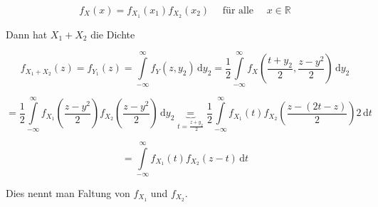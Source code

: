 \documentclass[12pt, a4paper]{article}
\theoremstyle{empty}
\newcommand{\R}{\mathbb{R}}
\newcommand{\1}{\mathds{1}}
\renewcommand{\d}{\,\mathrm{d}}
\providecommand{\mtext}[1]{\quad \text{#1} \quad}
\begin{document}
\[ f_X (x) = f_{X_1}(x_1) f_{X_2}(x_2) \mtext{ für alle } x \in \R      \]

Dann hat $X_1 + X_2$ die Dichte 

\[   f_{X_1 + X_2} (z) = f_{Y_1} (z) = \int\limits_{-\infty}^{\infty} f_Y (z, y_2) \d y_2  = \frac{1}{2} \int\limits_{-\infty}^{\infty} f_X (\frac{t + y_2}{2} , \frac{z - y^2}{2} ) \d y_2  \]

\[   = \frac{1}{2} \int\limits_{-\infty}^{\infty} f_{X_1} (\frac{z - y^2}{2}) f_{X_2}(\frac{z-y^2}{2}) \d y_2 \underbrace{=}_{t = \frac{z + y_2}{2}}  \frac{1}{2} \int\limits_{-\infty}^{\infty} f_{X_1} (t) f_{X_2} (\frac{z - (2t - z)}{2}) 2 \d t  \]

\[  =  \int\limits_{-\infty}^{\infty} f_{X_1} (t) f_{X_2}(z-t) \d t    \]

Dies nennt man Faltung von $f_{X_1}$ und $f_{X_2}$.
\end{document}
